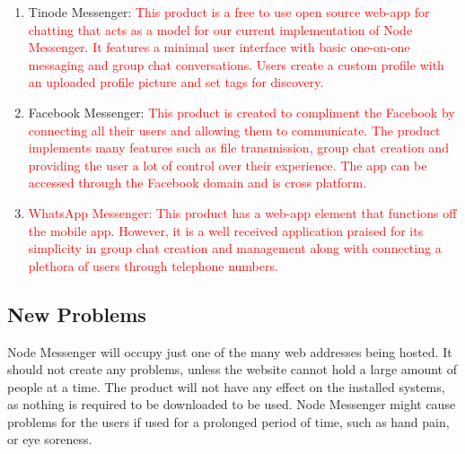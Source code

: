 \documentclass[12pt, titlepage]{article}
\begin{document}
    	\begin{enumerate}
    	    \item Tinode Messenger: \textcolor{red}{This product is a free to use open source web-app for chatting that acts as a model for our current implementation of Node Messenger. It features a minimal user interface with basic one-on-one messaging and group chat conversations. Users create a custom profile with an uploaded profile picture and set tags for discovery.}
    	    \item Facebook Messenger: \textcolor{red}{This product is created to compliment the Facebook by connecting all their users and allowing them to communicate. The product implements many features such as file transmission, group chat creation and providing the user a lot of control over their experience. The app can be accessed through the Facebook domain and is cross platform.}
    	    \item \textcolor{red}{WhatsApp Messenger: This product has a web-app element that functions off the mobile app. However, it is a well received application praised for its simplicity in group chat creation and management along with connecting a plethora of users through telephone numbers.}
    	\end{enumerate}

    	\subsection{New Problems}
    	Node Messenger will occupy just one of the many web addresses being hosted. It should not create any problems, unless the website cannot hold a large amount of people at a time. The product will not have any effect on the installed systems, as nothing is required to be downloaded to be used. Node Messenger might cause problems for the users if used for a prolonged period of time, such as hand pain, or eye soreness. 
\end{document}
